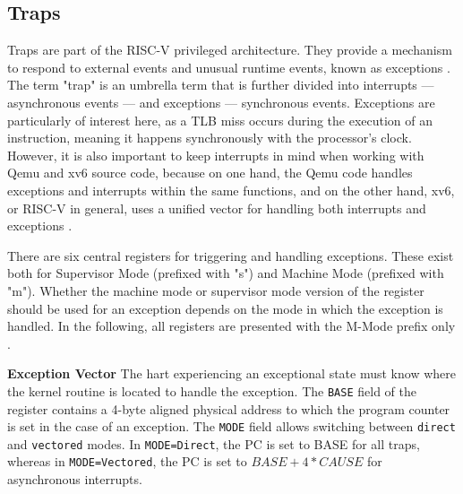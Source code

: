 
\subsection{Traps}
Traps are part of the RISC-V privileged architecture. They provide a mechanism to respond to
external events and unusual runtime events, known as exceptions \cite{riscvreader}.
The term "trap" is an umbrella term that is further divided into interrupts — asynchronous events —
and exceptions — synchronous events.
Exceptions are particularly of interest here, as a TLB miss occurs during the execution of an instruction,
meaning it happens synchronously with the processor's clock. However, it is also important to keep interrupts
in mind when working with Qemu and xv6 source code, because on one hand, the Qemu code handles exceptions
and interrupts within the same functions, and on the other hand, xv6, or RISC-V in general, uses a unified
vector for handling both interrupts and exceptions \cite{RISCVInstructionSet}.

There are six central registers for triggering and handling exceptions. These exist both for
Supervisor Mode (prefixed with "s") and Machine Mode (prefixed with "m").
Whether the machine mode or supervisor mode version of the register should be used for an exception depends
on the mode in which the exception is handled. In the following, all registers are presented with the
M-Mode prefix only .


\textbf{Exception Vector} The hart  experiencing
an exceptional state must know where the kernel routine is located to handle the exception.
The \texttt{BASE} field of the register contains a 4-byte aligned physical address to which
the program counter is set in the case of an exception.
The \texttt{MODE} field allows switching between \texttt{direct} and \texttt{vectored} modes.
In \texttt{MODE=Direct}, the PC is set to BASE for all traps, whereas in \texttt{MODE=Vectored},
the PC is set to $BASE+4*CAUSE$ for asynchronous interrupts.


